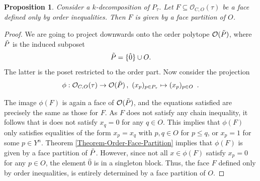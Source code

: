 \documentclass[12pt,a4paper]{amsart}
\newtheorem{proposition}[theorem]{Proposition}
\theoremstyle{definition}
\newcommand{\OP}{\mathcal{O}}
\newcommand{\Ptau}{P_\tau}
\begin{document}
\begin{proposition}\label{Proposition-Face-Partition}
Consider a $k$-decomposition of $\Ptau$.
Let $F\subseteq \OP_{C,O}(\tau)$ be a face defined only by order inequalities. 
%
Then $F$ is given by a face partition of $O$.
\end{proposition}
\begin{proof}
We are going to project downwards onto the order polytope $\OP(\Tilde{P})$,  where $\Tilde{P}$ is the induced subposet
%
\begin{equation*}
    \Tilde{P}=\{\hat{0}\}\cup O.
\end{equation*}
The latter is the poset restricted to the order part.
Now consider the projection
\[
  \phi:\OP_{C,O}(\tau)\rightarrow \OP(\Tilde{P}) \,,\ (x_p)_{p\in P_\tau}\mapsto (x_p)_{p\in O} \enspace .
\]

The image $\phi(F)$ is again a face of $\OP(\Tilde{P})$, and the equations satisfied are precisely the same as those for $F$. 
As $F$ does not satisfy any chain inequality, it follows that is does not satisfy $x_q=0$ for any $q\in O$.
This implies that $\phi(F)$ only satisfies equalities of the form $x_p=x_q$ with $p,q\in O$ for $p\leq q$, or $x_p=1$ for some $p\in Y^{{n}}$. 
Theorem \ref{Theorem-Order-Face-Partition} implies that $\phi(F)$ is given by a face partition of $\Tilde{P}$. 
However,  since not all $x\in\phi(F)$ satisfy $x_p=0$ for any $p\in O$, the element $\hat{0}$ is in a singleton block.
Thus, the face $F$ defined only by order inequalities, is entirely determined by a face partition of $O$.
\end{proof}
\end{document}
